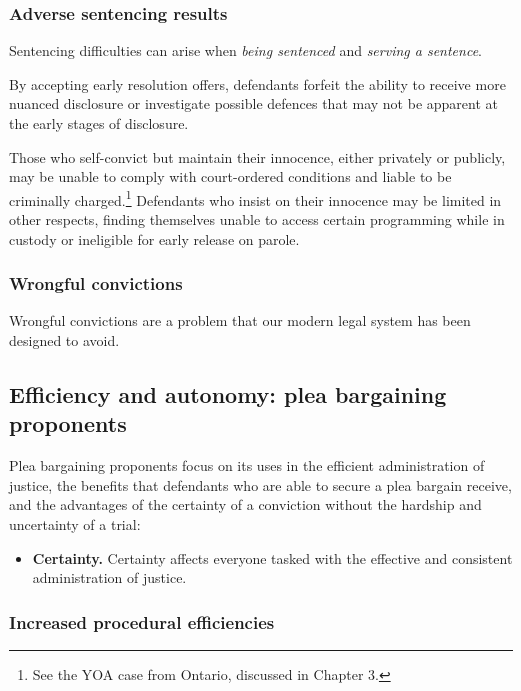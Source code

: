 \subsubsection{Adverse sentencing results}

Sentencing difficulties can arise when \textit{being sentenced} and \textit{serving a sentence}. 

By accepting early resolution offers, defendants forfeit the ability to receive more nuanced disclosure or investigate possible defences that may not be apparent at the early stages of disclosure.

Those who self-convict but maintain their innocence, either privately or publicly, may be unable to comply with court-ordered conditions and liable to be criminally charged.\footnote{See the YOA case from Ontario, discussed in Chapter 3.} Defendants who insist on their innocence may be limited in other respects, finding themselves unable to access certain programming while in custody or ineligible for early release on parole. 

\subsubsection{Wrongful convictions}

Wrongful convictions are a problem that our modern legal system has been designed to avoid.

\subsection{Efficiency and autonomy: plea bargaining proponents}

Plea bargaining proponents focus on its uses in the efficient administration of justice, the benefits that defendants who are able to secure a plea bargain receive, and the advantages of the certainty of a conviction without the hardship and uncertainty of a trial:

\begin{itemize}
\item \textbf{Certainty.} Certainty affects everyone tasked with the effective and consistent administration of justice.
\end{itemize}

\subsubsection{Increased procedural efficiencies}

